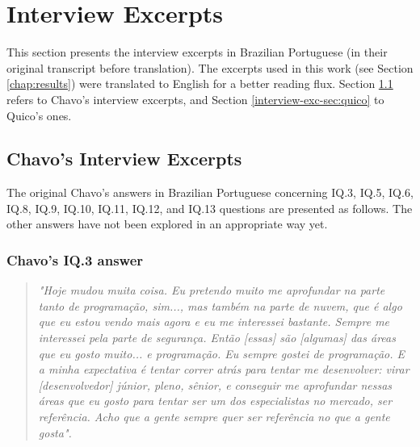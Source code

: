 \chapter{Interview Excerpts}
\label{chap:interview-excerpts}

This section presents the interview excerpts in Brazilian Portuguese (in their original transcript before translation). The excerpts used in this work (see Section \ref{chap:results}) were translated to English for a better reading flux. Section \ref{interview-exc-sec:chavo} refers to Chavo’s interview excerpts, and Section \ref{interview-exc-sec:quico} to Quico’s ones. 

\section{Chavo’s Interview Excerpts}
\label{interview-exc-sec:chavo}

The original Chavo's answers in Brazilian Portuguese concerning 
\gls{IQ}.3, 
\gls{IQ}.5, 
\gls{IQ}.6, 
\gls{IQ}.8, 
\gls{IQ}.9, 
\gls{IQ}.10, 
\gls{IQ}.11,   
\gls{IQ}.12, and 
\gls{IQ}.13
questions are presented as follows. The other answers have not been explored in an appropriate way yet.



\subsection{Chavo’s IQ.3 answer}
\label{interview-exc-ss:chavo-iq3}

\begin{quote}
    \itshape
    "Hoje mudou muita coisa. Eu pretendo muito me aprofundar na parte tanto de programação, sim..., mas também na parte de nuvem, que é algo que eu estou vendo mais agora e eu me interessei bastante. Sempre me interessei pela parte de segurança. Então [essas] são [algumas] das áreas que eu gosto muito... e programação. Eu sempre gostei de programação. E a minha expectativa é tentar correr atrás para tentar me desenvolver: virar [desenvolvedor] júnior, pleno, sênior, e conseguir me aprofundar nessas áreas que eu gosto para tentar ser um dos especialistas no mercado, ser referência. Acho que a gente sempre quer ser referência no que a gente gosta".
\end{quote}

